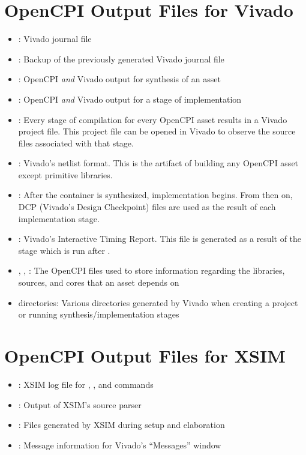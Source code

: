 \begin{flushleft}
\section{OpenCPI Output Files for Vivado}
\begin{itemize}
\item {}: Vivado journal file
\item {}: Backup of the previously generated Vivado journal file
\item {}: OpenCPI \textit{and} Vivado output for synthesis of an asset
\item {}: OpenCPI \textit{and} Vivado output for a stage of implementation
\item {}: Every stage of compilation for every OpenCPI asset results in a Vivado project file. This project file can be opened in Vivado to observe the source files associated with that stage.
\item {}: Vivado's netlist format. This is the artifact of building any OpenCPI asset except primitive libraries.
\item {}: After the container is synthesized, implementation begins. From then on, DCP (Vivado's Design Checkpoint) files are used as the result of each implementation stage.
\item {}: Vivado's Interactive Timing Report. This file is generated as a result of the  stage which is run after .
\item {}, , : The OpenCPI files used to store information regarding the libraries, sources, and cores that an asset depends on
\item {} directories: Various directories generated by Vivado when creating a project or running synthesis/implementation stages
\end{itemize}
\section{OpenCPI Output Files for XSIM}
\begin{itemize}
\item {}: XSIM log file for , , and  commands
\item {}: Output of XSIM's source parser
\item {}: Files generated by XSIM during setup and elaboration
\item {}: Message information for Vivado's ``Messages'' window
\end{itemize}
\end{flushleft}

